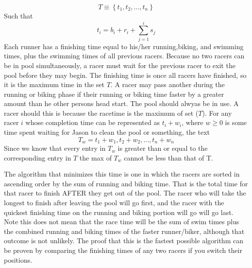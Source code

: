 \documentclass[11pt]{article}
\begin{document}
\begin{enumerate}[1.]
\begin{equation*}
T\equiv\left\{t_1,t_2,\ldots,t_n\right\}
\end{equation*}
Such that
\begin{equation*}
t_i=b_i+r_i+\sum_{j=1}^is_j
\end{equation*} 
Each runner has a finishing time equal to his/her running,biking, and swimming times, plus the swimming times of all previous racers.
 Because no two racers can be in pool simultaneously, a racer must wait for the previous racer to exit the pool before they may begin.
 The finishing time is once all racers have finished, so it is the maximum time in the set $T$. 
A racer may pass another during the running or biking phase if their running or biking time faster by a greater amount than he other persons head start.
The pool should alwyas be in use.
A racer should this is because the racetime is the maximum of set ($T$).  
For any racer $i$ whose completion time can be represented as $t_i+w_i$, where $w\ge0$ is some time spent waiting for Jason to clean the pool or something, the text 
\begin{equation*}
T_w={t_1+w_1, t_2+w_2,\ldots,t_n+w_n}
\end{equation*}
Since we know that every entry in $T_w$ is greater than or equal to the corresponding entry in $T$ the max of $T_w$ cannot be less than that of T.
 
The algorithm that minimizes this time is one in which the racers are sorted in ascending order by the sum of running and biking time.  That is the total time for that racer to finish AFTER they get out of the pool.
The racer who will take the longest to finish after leaving the pool will go first, and the racer with the quickest finishing time on the running and biking portion will go will go last.
Note this does not mean that the race time will be the sum of swim times plus the combined running and biking times of the faster runner/biker, although that outcome is not unlikely.
The proof that this is the fastest possible algorithm can be proven by comparing the finishing times of any two racers if you switch their positions.


\end{enumerate}
\end{document}
